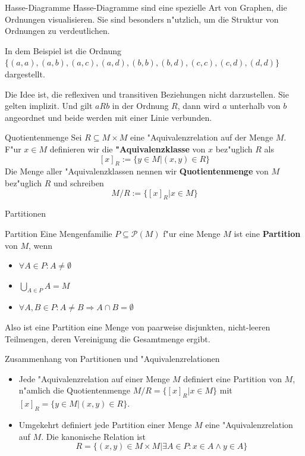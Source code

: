 \documentclass{beamer}
\begin{document}
  \begin{frame}{Hasse-Diagramme}
    Hasse-Diagramme sind eine spezielle Art von Graphen, die Ordnungen visualisieren. Sie sind besonders n"utzlich, um die Struktur von Ordnungen zu verdeutlichen.


    In dem Beispiel ist die Ordnung $\{(a,a),(a,b),(a,c),(a,d),(b,b),(b,d),(c,c),(c,d),(d,d)\}$ dargestellt.

    Die Idee ist, die reflexiven und transitiven Beziehungen nicht darzustellen. Sie gelten implizit. Und gilt $aRb$ in der Ordnung $R$, dann wird $a$ unterhalb von $b$ angeordnet und beide werden mit einer Linie verbunden.
    
  \end{frame}

  \begin{frame}{Quotientenmenge}
    Sei $R\subseteq M\times M$ eine "Aquivalenzrelation auf der Menge $M$. F"ur $x\in M$ definieren wir die \textbf{"Aquivalenzklasse} von $x$ bez"uglich $R$ als 
    \[[x]_R:=\{y\in M|(x,y)\in R\}\]
    Die Menge aller "Aquivalenzklassen nennen wir \textbf{Quotientenmenge} von $M$ bez"uglich $R$ und schreiben 
    \[M/R:=\{[x]_R|x\in M\}\]
  \end{frame}

\begin{frame}{Partitionen}
\begin{definition}{Partition}
  Eine Mengenfamilie $P\subseteq\mathscr{P}(M)$ f"ur eine Menge $M$ ist eine \textbf{Partition} von $M$, wenn
  \begin{itemize}
    \item $\forall A\in P:A\neq\emptyset$
    \item $\bigcup_{A\in P} A=M$
    \item $\forall A,B\in P:A\neq B\Rightarrow A\cap B=\emptyset$
  \end{itemize}
\end{definition}
Also ist eine Partition eine Menge von paarweise disjunkten, nicht-leeren Teilmengen, deren Vereinigung die Gesamtmenge ergibt.
\end{frame}
\begin{frame}{Zusammenhang von Partitionen und "Aquivalenzrelationen}
  \begin{itemize}
    \item Jede "Aquivalenzrelation auf einer Menge $M$ definiert eine Partition von $M$, n"amlich die Quotientenmenge $M/R=\{[x]_R|x\in M\}$ mit $[x]_R=\{y\in M|(x,y)\in R\}$.
    \item Umgekehrt definiert jede Partition einer Menge $M$ eine "Aquivalenzrelation auf $M$. Die kanonische Relation ist \[R=\{(x,y)\in M\times M|\exists A\in P:x\in A\wedge y\in A\}\]
  \end{itemize}
\end{frame}
\end{document}
